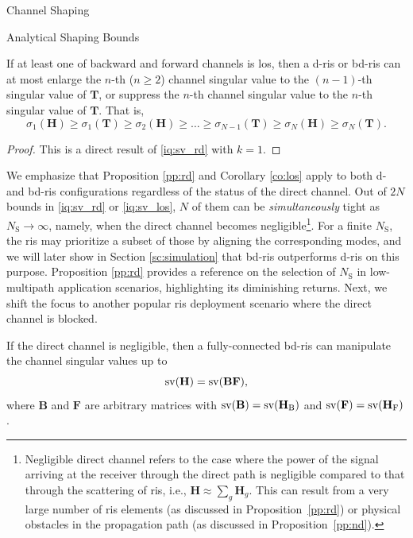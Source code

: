 \documentclass[journal]{IEEEtran}
\begin{document}
\begin{section}{Channel Shaping}
\begin{subsection}{Analytical Shaping Bounds}
		\begin{corollary}
			\label{co:los}
			If at least one of backward and forward channels is \gls{los}, then a \gls{d}-\gls{ris} or \gls{bd}-\gls{ris} can at most enlarge the $n$-th ($n \ge 2$) channel singular value to the $(n-1)$-th singular value of $\mathbf{T}$, or suppress the $n$-th channel singular value to the $n$-th singular value of $\mathbf{T}$.
			That is,
			\begin{equation}
				\label{iq:sv_los}
				\sigma_1(\mathbf{H}) \ge \sigma_1(\mathbf{T}) \ge {\sigma_2(\mathbf{H})} \ge \ldots \ge \sigma_{N-1}(\mathbf{T}) \ge {\sigma_N(\mathbf{H})} \ge \sigma_N(\mathbf{T}).
			\end{equation}
		\end{corollary}

		\begin{proof}
			This is a direct result of \eqref{iq:sv_rd} with $k = 1$.
		\end{proof}

		We emphasize that Proposition \ref{pp:rd} and Corollary \ref{co:los} apply to both \gls{d}- and \gls{bd}-\gls{ris} configurations regardless of the status of the direct channel.
		Out of $2N$ bounds in \eqref{iq:sv_rd} or \eqref{iq:sv_los}, $N$ of them can be \emph{simultaneously} tight as $N_\mathrm{S} \to \infty$, namely, when the direct channel becomes negligible\footnote{Negligible direct channel refers to the case where the power of the signal arriving at the receiver through the direct path is negligible compared to that through the scattering of \gls{ris}, i.e., $\mathbf{H} \approx \sum_g \mathbf{H}_g$. This can result from a very large number of \gls{ris} elements (as discussed in Proposition~\ref{pp:rd}) or physical obstacles in the propagation path (as discussed in Proposition~\ref{pp:nd}).}.
		For a finite $N_\mathrm{S}$, the \gls{ris} may prioritize a subset of those by aligning the corresponding modes, and we will later show in Section \ref{sc:simulation} that \gls{bd}-\gls{ris} outperforms \gls{d}-\gls{ris} on this purpose.
		Proposition \ref{pp:rd} provides a reference on the selection of $N_\mathrm{S}$ in low-multipath application scenarios, highlighting its diminishing returns.
		Next, we shift the focus to another popular \gls{ris} deployment scenario where the direct channel is blocked.


		\begin{proposition}
			\label{pp:nd}
			If the direct channel is negligible, then a fully-connected \gls{bd}-\gls{ris} can manipulate the channel singular values up to
			\begin{equation}
				\operatorname{sv}(\mathbf{H}) = \operatorname{sv}(\mathbf{BF}),
			\end{equation}
			where $\mathbf{B}$ and $\mathbf{F}$ are arbitrary matrices with $\operatorname{sv}(\mathbf{B})=\operatorname{sv}(\mathbf{H}_\mathrm{B})$ and $\operatorname{sv}(\mathbf{F})=\operatorname{sv}(\mathbf{H}_\mathrm{F})$.
		\end{proposition}


\end{subsection}
\end{section}
\end{document}
